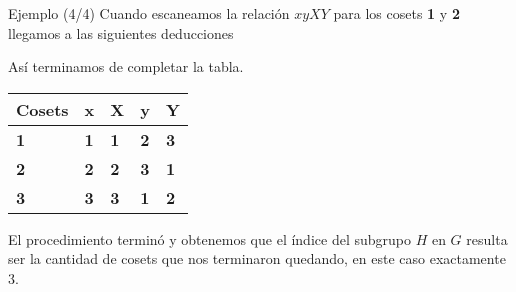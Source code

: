 \documentclass[aspectratio=169, 9pt]{beamer}
\begin{document}
\begin{frame}[fragile]{Ejemplo (4/4)}
	Cuando escaneamos la relación $xyXY$ para los cosets \textbf{1} y \textbf{2} 
	llegamos a las siguientes deducciones 
	
	\begin{center}
	\end{center}

\pause
	Así terminamos de completar la tabla.
	
	\begin{table}[]
		\begin{tabular}{|l|l|l|l|l|}
			\hline
			Cosets     & x          & X          & y          & Y          \\ \hline
			\textbf{1} & \textbf{1} & \textbf{1} & \textbf{2} & \textbf{3} \\ \hline
			\textbf{2} & \color{verde}\textbf{2} & \color{verde}\textbf{2} & \textbf{3} & \textbf{1} \\ \hline
			\textbf{3} & \color{verde}\textbf{3} & \color{verde}\textbf{3} & \textbf{1} & \textbf{2} \\ \hline
		\end{tabular}
	\end{table}
	
	El procedimiento terminó y obtenemos que el índice del subgrupo $H$ en $G$ resulta ser la cantidad de cosets que nos terminaron quedando, en este caso exactamente $3$.
\end{frame}
\end{document}
